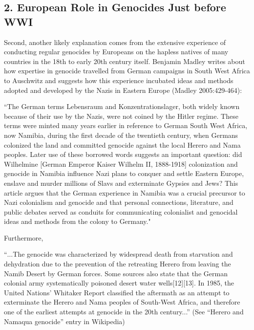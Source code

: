 \subsection*{2. European Role in Genocides Just before WWI}

Second, another likely explanation comes from the extensive experience of conducting regular genocides by Europeans on the hapless natives of many countries in the 18th to early 20th century itself. Benjamin Madley writes about how expertise in genocide travelled from German campaigns in South West Africa to Auschwitz and suggests how this experience incubated ideas and methods adopted and developed by the Nazis in Eastern Europe (Madley 2005:429-464):

\begin{myquote}
``The German terms Lebensraum and Konzentrationslager, both widely known because of their use by the Nazis, were not coined by the Hitler regime. These terms were minted many years earlier in reference to German South West Africa, now Namibia, during the first decade of the twentieth century, when Germans colonized the land and committed genocide against the local Herero and Nama peoples. Later use of these borrowed words suggests an important question: did Wilhelmine [German Emperor Kaiser Wilhelm II, 1888-1918] colonization and genocide in Namibia  influence Nazi plans to conquer and settle Eastern Europe, enslave and murder millions of Slavs and exterminate Gypsies and Jews? This article argues that the German experience in Namibia was a crucial precursor to Nazi colonialism and genocide and that personal connections, literature, and public debates served as conduits for communicating colonialist and genocidal ideas and methods from the colony to Germany."
\end{myquote}

Furthermore, 
\begin{myquote}
“$\ldots$The genocide was characterized by widespread death from starvation and dehydration due to the prevention of the retreating Herero from leaving the Namib Desert by German forces. Some sources also state that the German colonial army systematically poisoned desert water wells[12][13]. In 1985, the United Nations' Whitaker Report classified the aftermath as an attempt to exterminate the Herero and Nama peoples of South-West Africa, and therefore one of the earliest attempts at genocide in the 20th century...” \hfill(See “Herero and Namaqua genocide” entry in Wikipedia)
\end{myquote}

